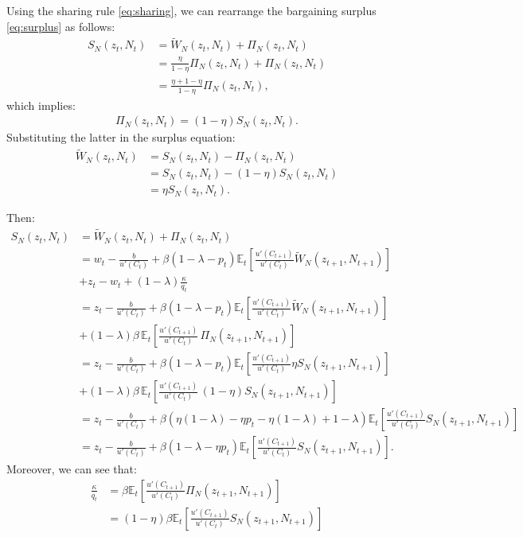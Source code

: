 \documentclass[dvipsnames,11pt]{article}
\begin{document}
\begin{enumerate}
\begin{solution}
    Using the sharing rule \eqref{eq:sharing}, we can rearrange the bargaining surplus \eqref{eq:surplus}
as follows:
\begin{align*}
    S_N(z_t,N_t) &= \widetilde{W}_N(z_t,N_t) + \Pi_N(z_t,N_t) \\
    &= \frac{\eta}{1-\eta} \Pi_N(z_t,N_t)+ \Pi _N(z_t,N_t) \\
    & =\frac{\eta +1-\eta }{1-\eta} \Pi_N(z_t,N_t),
\end{align*}
which implies:
\begin{align*}
    \Pi_N(z_t,N_t)=(1-\eta) S_N(z_t,N_t).
\end{align*}
Substituting the latter in the surplus equation:
\begin{align*}
    \widetilde{W}_N(z_t,N_t)&=S_N(z_t,N_t)-\Pi_N(z_t,N_t) \\
    &= S_N (z_t,N_t)-(1-\eta)S_N(z_t,N_t) \\
    &= \eta S _N(z_t,N_t).
\end{align*}

Then:
\begin{align*}
    S_N(z_t,N_t)&=\widetilde{W}_N(z_t,N_t)+\Pi_N(z_t,N_t) \\
    &= w_t-\frac{b}{u'(C_t)}+\beta (1-\lambda-p_t) \mathbb{E}_t \left[ \frac{u'(C_{t+1})}{u'(C_t)}\widetilde{W}_N(z_{t+1},N_{t+1}) \right]\\&+z_t-w_t+(1-\lambda)\frac{\kappa}{q_t} \\
    &= z_t-\frac{b}{u'(C_t)}+\beta (1-\lambda-p_t) \mathbb{E}_t \left[ \frac{u'(C_{t+1})}{u'(C_t)}\widetilde{W}_N(z_{t+1},N_{t+1}) \right]\\&+(1-\lambda)\beta\,\mathbb{E}_t\left[\frac{u'(C_{t+1})}{u'(C_t)}\, \Pi_N(z_{t+1},N_{t+1})\right] \\
    &=z_t-\frac{b}{u'(C_t)}+\beta (1-\lambda-p_t) \mathbb{E}_t \left[ \frac{u'(C_{t+1})}{u'(C_t)}\eta S_N(z_{t+1},N_{t+1}) \right]\\&+(1-\lambda)\beta\,\mathbb{E}_t\left[\frac{u'(C_{t+1})}{u'(C_t)}\, (1-\eta)S_N(z_{t+1},N_{t+1})\right] \\
    &= z_t-\frac{b}{u'(C_t)}+\beta (\eta(1-\lambda)-\eta p_t-\eta(1-\lambda)+1-\lambda) \mathbb{E}_t \left[ \frac{u'(C_{t+1})}{u'(C_t)}S_N(z_{t+1},N_{t+1}) \right] \\
    &= z_t-\frac{b}{u'(C_t)}+ \beta (1-\lambda-\eta p_t)\mathbb{E}_t \left[ \frac{u'(C_{t+1})}{u'(C_t)}S_N(z_{t+1},N_{t+1}) \right].
\end{align*}
Moreover, we can see that:
\begin{align*}
    \frac{\kappa}{q_t}&=\beta \mathbb{E}_t\left[\frac{u'(C_{t+1})}{u'(C_t)}\Pi_N(z_{t+1},N_{t+1})\right] \\
    &= (1-\eta)\beta \mathbb{E}_t\left[\frac{u'(C_{t+1})}{u'(C_t)}S_N(z_{t+1},N_{t+1})\right]
\end{align*}



\end{solution}
\end{enumerate}
\end{document}
